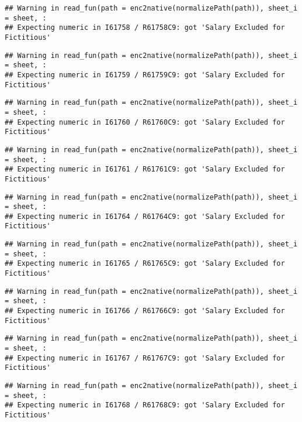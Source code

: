 \documentclass[
]{article}
\begin{document}
\begin{verbatim}
## Warning in read_fun(path = enc2native(normalizePath(path)), sheet_i = sheet, :
## Expecting numeric in I61758 / R61758C9: got 'Salary Excluded for Fictitious'
\end{verbatim}

\begin{verbatim}
## Warning in read_fun(path = enc2native(normalizePath(path)), sheet_i = sheet, :
## Expecting numeric in I61759 / R61759C9: got 'Salary Excluded for Fictitious'
\end{verbatim}

\begin{verbatim}
## Warning in read_fun(path = enc2native(normalizePath(path)), sheet_i = sheet, :
## Expecting numeric in I61760 / R61760C9: got 'Salary Excluded for Fictitious'
\end{verbatim}

\begin{verbatim}
## Warning in read_fun(path = enc2native(normalizePath(path)), sheet_i = sheet, :
## Expecting numeric in I61761 / R61761C9: got 'Salary Excluded for Fictitious'
\end{verbatim}

\begin{verbatim}
## Warning in read_fun(path = enc2native(normalizePath(path)), sheet_i = sheet, :
## Expecting numeric in I61764 / R61764C9: got 'Salary Excluded for Fictitious'
\end{verbatim}

\begin{verbatim}
## Warning in read_fun(path = enc2native(normalizePath(path)), sheet_i = sheet, :
## Expecting numeric in I61765 / R61765C9: got 'Salary Excluded for Fictitious'
\end{verbatim}

\begin{verbatim}
## Warning in read_fun(path = enc2native(normalizePath(path)), sheet_i = sheet, :
## Expecting numeric in I61766 / R61766C9: got 'Salary Excluded for Fictitious'
\end{verbatim}

\begin{verbatim}
## Warning in read_fun(path = enc2native(normalizePath(path)), sheet_i = sheet, :
## Expecting numeric in I61767 / R61767C9: got 'Salary Excluded for Fictitious'
\end{verbatim}

\begin{verbatim}
## Warning in read_fun(path = enc2native(normalizePath(path)), sheet_i = sheet, :
## Expecting numeric in I61768 / R61768C9: got 'Salary Excluded for Fictitious'
\end{verbatim}
\end{document}
